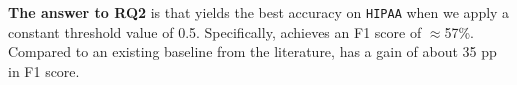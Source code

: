 \begin{tcolorbox}[arc=1mm,width=\columnwidth,
                  top=0mm,left=0mm,  right=0mm, bottom=0mm,
                  boxrule=1pt, colback=violet!15!white,colframe=white]           
\textbf{The answer to RQ2} is that \kashif yields the  best accuracy  on \texttt{HIPAA} when we apply a constant threshold value of 0.5.  Specifically, \kashif achieves an F1 score of $\approx$57\%. Compared to an existing baseline from the literature, \kashif has a gain of about 35 pp in F1 score.  
\end{tcolorbox}
